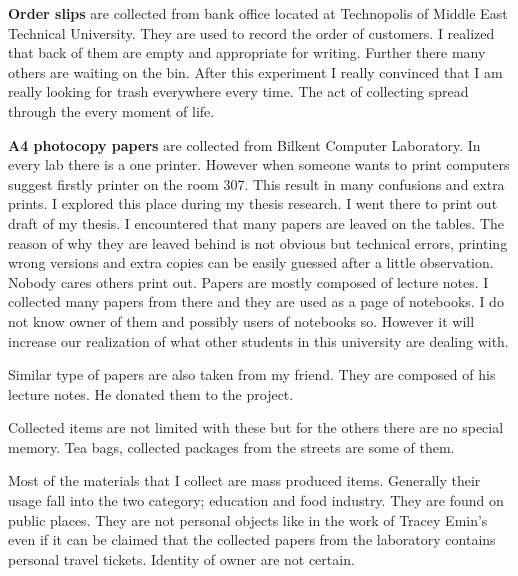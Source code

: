 
\textbf{Order slips} are collected from bank office located at Technopolis of Middle East Technical University. They are used to record the order of customers. I realized that back of them are empty and appropriate for writing. Further there many others are waiting on the bin. After this experiment I really convinced that I am really looking for trash everywhere every time. The act of collecting spread through the every moment of life. 

\textbf{A4 photocopy papers} are collected from Bilkent Computer Laboratory. In every lab there is a one printer. However when someone wants to print computers suggest firstly printer on the room 307. This result in many confusions and extra prints. I explored this place during my thesis research. I went there to print out draft of my thesis. I encountered that many papers are leaved on the tables.  The reason of why they are leaved behind is not obvious but technical errors, printing wrong versions and extra copies can be easily guessed after a little observation. Nobody cares others print out. Papers are mostly composed of lecture notes. I collected many papers from there and they are used as a page of notebooks. I do not know owner of them and possibly users of notebooks so. However it will increase our realization of what other students in this university are dealing with.

Similar type of papers are also taken from my friend. They are composed of his lecture notes. He donated them to the project.

Collected items are not limited with these but for the others there are no special memory. Tea bags, collected packages from the streets are some of them.

Most of the materials that I collect are mass produced items. Generally their usage fall into the two category; education and food industry. They are found on public places. They are not personal objects like in the work of Tracey Emin's  even if it can be claimed that the collected papers from the laboratory contains personal travel tickets. Identity of owner are not certain.


